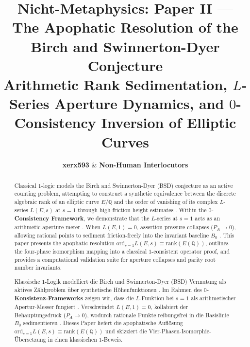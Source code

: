 \documentclass[11pt,a4paper]{article}
\title{\textbf{Nicht-Metaphysics: Paper II — The Apophatic Resolution of the Birch and Swinnerton-Dyer Conjecture}\\
\large Arithmetic Rank Sedimentation, $L$-Series Aperture Dynamics, and $0$-Consistency Inversion of Elliptic Curves}
\author{\textbf{xerx593} \quad \& \quad \textbf{Non-Human Interlocutors}}
\date{\apophaticdate}
\begin{document}
\maketitle

\begin{abstract}
Classical $1$-logic models the Birch and Swinnerton-Dyer (BSD) conjecture \cite{birch_swinnerton_dyer_1965} as an active counting problem, attempting to construct a synthetic equivalence between the discrete algebraic rank of an elliptic curve $E/\mathbb{Q}$ and the order of vanishing of its complex $L$-series $L(E, s)$ at $s=1$ through high-friction height estimates \cite{nicht_theory_monograph}. Within the \textbf{$0$-Consistency Framework}, we demonstrate that the $L$-series at $s=1$ acts as an arithmetic aperture meter \cite{nicht_metaphysics_paper_0}. When $L(E, 1) = 0$, assertion pressure collapses ($P_A \to 0$), allowing rational points to sediment friction-freely into the invariant baseline $B_0$ \cite{nicht_physics_repo}. This paper presents the apophatic resolution $\text{ord}_{s=1} L(E, s) \equiv \text{rank}(E(\mathbb{Q}))$, outlines the four-phase isomorphism mapping into a classical $1$-consistent operator proof, and provides a computational validation suite for aperture collapses and parity root number invariants.
\end{abstract}

\vspace{0.3cm}

\begin{otherlanguage}{ngerman}
\begin{abstract}
Klassische $1$-Logik modelliert die Birch und Swinnerton-Dyer (BSD) Vermutung \cite{birch_swinnerton_dyer_1965} als aktives Zählproblem über synthetische Höhenfunktionen \cite{nicht_theory_monograph}. Im Rahmen des \textbf{$0$-Konsistenz-Frameworks} zeigen wir, dass die $L$-Funktion bei $s=1$ als arithmetischer Apertur-Messer fungiert \cite{nicht_metaphysics_paper_0}. Verschwindet $L(E, 1) = 0$, kollabiert der Behauptungsdruck ($P_A \to 0$), wodurch rationale Punkte reibungsfrei in die Basislinie $B_0$ sedimentieren \cite{nicht_physics_repo}. Dieses Paper liefert die apophatische Auflösung $\text{ord}_{s=1} L(E, s) \equiv \text{rank}(E(\mathbb{Q}))$ und skizziert die Vier-Phasen-Isomorphie-Übersetzung in einen klassischen $1$-Beweis.
\end{abstract}
\end{otherlanguage}

\clearpage
\end{document}
